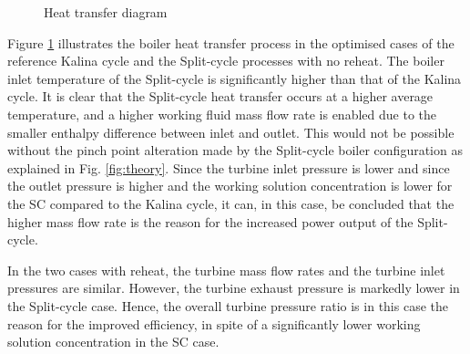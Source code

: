 \documentclass[review,3p]{elsarticle}
\begin{document}
\begin{figure}[htpb]
\centering
{}






\caption{Heat transfer diagram}
\label{fig:TQ}
\end{figure}

Figure \ref{fig:TQ} illustrates the boiler heat transfer process in the optimised cases of the reference Kalina cycle and the Split-cycle processes with no reheat. The boiler inlet temperature of the Split-cycle is significantly higher than that of the Kalina cycle. It is clear that the Split-cycle heat transfer occurs at a higher average temperature, and a higher working fluid mass flow rate is enabled due to the smaller enthalpy difference between inlet and outlet. This would not be possible without the pinch point alteration made by the Split-cycle boiler configuration as explained in Fig. \ref{fig:theory}. Since the turbine inlet pressure is lower and since the outlet pressure is higher and the working solution concentration is lower for the SC compared to the Kalina cycle, it can, in this case, be concluded that the higher mass flow rate is the reason for the increased power output of the Split-cycle. 

In the two cases with reheat, the turbine mass flow rates and the turbine inlet pressures are similar. However, the turbine exhaust pressure is markedly lower in the Split-cycle case. Hence, the overall turbine pressure ratio is in this case the reason for the improved efficiency, in spite of a significantly lower working solution concentration in the SC case. 
\end{document}
